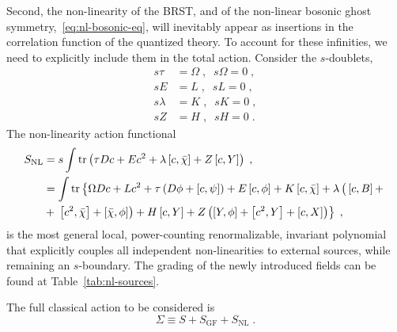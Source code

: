 \documentclass[../main.tex]{subfiles}
\begin{document}
Second, the non-linearity of the BRST, and of the non-linear bosonic ghost symmetry,~\eqref{eq:nl-bosonic-eq}, will inevitably appear as insertions in the correlation function of the quantized theory. To account for these infinities, we need to explicitly include them in the total action. Consider the $ s $-doublets,
\begin{subequations}%
  \label{eq:nl-s-doublets}
  \begin{align}
    s\tau    & = \Omega \;, \;\; s\Omega   = 0 \;, \\
    sE       & = L \;, \;\; sL        = 0 \;,      \\
    s\lambda & = K \;, \;\; sK        = 0 \;,      \\
    sZ       & = H \;, \;\; sH        = 0 \;.
  \end{align}
\end{subequations}
The non-linearity action functional
\begin{subequations}%
  \label{eq:nl-action}
  \begin{align}
    S_{\text{NL}} & = s \int \operatorname{tr} \left( \tau Dc + E c^2 + \lambda \left[ c,\bar\chi \right] + Z \left[ c,Y \right] \right) \;, \label{eq:nl-action-1}                                                                                           \\
                  & = \int \operatorname{tr} \left\{ \Omega Dc + Lc^2 + \tau \left( D\phi + \left[ c,\psi \right] \right) + E \left[ c,\phi \right] + K \left[ c,\bar\chi \right] + \lambda \left(\vphantom{^2}\left[ c,B \right] + \right. \right. \nonumber \\
                  & + \left. \left. \left[ c^2,\bar\chi \right] + \left[ \bar\chi,\phi \right] \right) + H \left[ c, Y \right] + Z \left( \left[ Y, \phi \right] + \left[ c^2, Y \right] + \left[ c, X \right] \right) \right\} \;,
  \end{align}
\end{subequations}
is the most general local, power-counting renormalizable, invariant polynomial that explicitly couples all independent non-linearities to external sources, while remaining an $ s $-boundary. The grading of the newly introduced fields can be found at Table~\ref{tab:nl-sources}.

The full classical action to be considered is
\begin{equation}
  \label{eq:total-action}
  \Sigma \equiv S + S_{\text{GF}} + S_{ \text{NL} }\; .
\end{equation}
\end{document}

